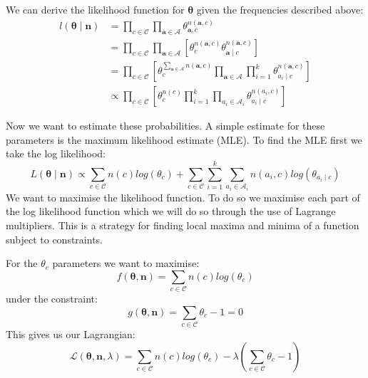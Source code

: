 We can derive the likelihood function for $\mathbf{\theta}$ given the frequencies described above:
\begin{align} \label{likelihood}
	l(\mathbf{\theta} \mid \mathbf{n}) & =  \prod_{c \in \mathcal{C}} \prod_{\mathbf{a} \in \mathbf{\mathcal{A}}} \theta_{\mathbf{a}, c}^{n(\mathbf{a}, c)} \\
	& = \prod_{c \in \mathcal{C}} \prod_{\mathbf{a} \in \mathbf{\mathcal{A}}} \left[ \theta_{c}^{n(\mathbf{a}, c)} \theta_{\mathbf{a} \mid c}^{n(\mathbf{a}, c)} \right] \\
	& = \prod_{c \in \mathcal{C}} \left[ \theta_{c}^{\sum_{\mathbf{a} \in \mathbf{\mathcal{A}}} n(\mathbf{a}, c)} \prod_{\mathbf{a} \in \mathbf{\mathcal{A}}} \prod_{i=1}^k \theta_{a_i \mid c}^{n(\mathbf{a}, c)} \right] \\
	& \propto \prod_{c \in \mathcal{C}} \left[ \theta_c^{n(c)} \prod_{i=1}^k \prod_{a_i \in \mathcal{A}_i} \theta_{a_i \mid c}^{n(a_i, c)} \right]
\end{align}

Now we want to estimate these probabilities.
A simple estimate for these parameters is the maximum likelihood estimate (MLE).
To find the MLE first we take the log likelihood:
\begin{equation}
	L(\mathbf{\theta} \mid \mathbf{n}) \propto \sum_{c \in \mathcal{C}}  n(c)log(\theta_c) + \sum_{c \in \mathcal{C}} \sum_{i=1}^k \sum_{a_i \in \mathcal{A}_i} n(a_i, c) log(\theta_{a_i \mid c}) 
\end{equation}
We want to maximise the likelihood function.
To do so we maximise each part of the log likelihood function which we will do so through the use of Lagrange multipliers.
This is a strategy for finding local maxima and minima of a function subject to constraints.

For the $\theta_c$ parameters we want to maximise:
\begin{equation}
	f(\mathbf{\theta}, \mathbf{n}) = \sum_{c \in \mathcal{C}}  n(c)log(\theta_c)
\end{equation}
under the constraint:
\begin{equation}\label{theta_c constraint}
	g(\mathbf{\theta}, \mathbf{n}) = \sum_{c \in \mathcal{C}}  \theta_c - 1 = 0
\end{equation}
This gives us our Lagrangian:
\begin{equation}
	\mathcal{L}(\mathbf{\theta}, \mathbf{n}, \lambda) = \sum_{c \in \mathcal{C}}  n(c)log(\theta_c) - \lambda(\sum_{c \in \mathcal{C}}  \theta_c - 1)
\end{equation}

